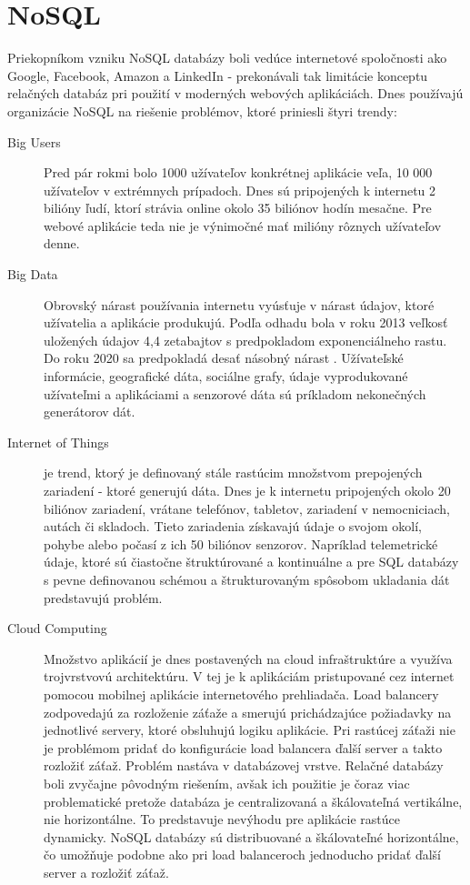 \section{NoSQL}
	Priekopníkom vzniku NoSQL databázy boli vedúce internetové spoločnosti ako Google, Facebook, Amazon a LinkedIn - prekonávali tak limitácie konceptu relačných databáz pri použití v moderných webových aplikáciách. Dnes používajú organizácie NoSQL na riešenie problémov, ktoré priniesli štyri trendy:
	\begin{description}
		\item[Big Users] Pred pár rokmi bolo 1000 užívateľov konkrétnej aplikácie veľa, 10 000 užívateľov v extrémnych prípadoch. Dnes sú pripojených k internetu 2 bilióny ľudí, ktorí strávia online okolo 35 biliónov hodín mesačne. Pre webové aplikácie teda nie je výnimočné mať milióny rôznych užívateľov denne.
		
		\item[Big Data] Obrovský nárast používania internetu vyúsťuje v nárast údajov, ktoré užívatelia a aplikácie produkujú. Podľa odhadu bola v roku 2013 veľkosť uložených údajov 4,4 zetabajtov s predpokladom exponenciálneho rastu. Do roku 2020 sa predpokladá desať násobný nárast \cite{web:idc-bigdata}. Užívateľské informácie, geografické dáta, sociálne grafy, údaje vyprodukované užívateľmi a aplikáciami a senzorové dáta sú príkladom nekonečných generátorov dát.
		
		\item[Internet of Things] je trend, ktorý je definovaný stále rastúcim množstvom prepojených zariadení - ktoré generujú dáta. Dnes je k internetu pripojených okolo 20 biliónov zariadení, vrátane telefónov, tabletov, zariadení v nemocniciach, autách či skladoch. Tieto zariadenia získavajú údaje o svojom okolí, pohybe alebo počasí z ich 50 biliónov senzorov.
		Napríklad telemetrické údaje, ktoré sú čiastočne štruktúrované a kontinuálne a pre SQL databázy s pevne definovanou schémou a štrukturovaným spôsobom ukladania dát predstavujú problém.
		
		\item[Cloud Computing] Množstvo aplikácií je dnes postavených na cloud infraštruktúre a využíva trojvrstvovú architektúru. V tej je k aplikáciám pristupované cez internet pomocou mobilnej aplikácie internetového prehliadača. Load balancery zodpovedajú za rozloženie záťaže a smerujú prichádzajúce požiadavky na jednotlivé servery, ktoré obsluhujú logiku aplikácie. Pri rastúcej záťaži nie je problémom pridať do konfigurácie load balancera ďalší server a takto rozložiť záťaž.
		Problém nastáva v databázovej vrstve. Relačné databázy boli zvyčajne pôvodným riešením, avšak ich použitie je čoraz viac problematické pretože databáza je centralizovaná a škálovateľná vertikálne, nie horizontálne. To predstavuje nevýhodu pre aplikácie rastúce dynamicky. NoSQL databázy sú distribuované a škálovateľné horizontálne, čo umožňuje podobne ako pri load balanceroch jednoducho pridať ďalší server a rozložiť záťaž.
	\end{description}
	

